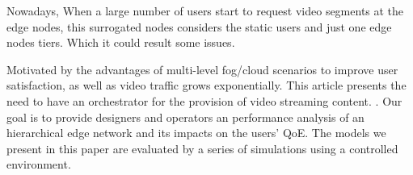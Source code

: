 Nowadays, When a large number of users start to request video segments at the edge nodes, this surrogated nodes considers the static users and just one edge nodes tiers. Which it could result some issues. 

Motivated by the advantages of multi-level fog/cloud scenarios to improve user satisfaction, as well as video traffic grows exponentially. This article presents the need to have an orchestrator for the provision of video streaming content.
. Our goal is to provide designers and operators an performance analysis  of an hierarchical edge network and its impacts on the users' QoE. The models we present in this paper are evaluated by a series of simulations using a controlled environment.

